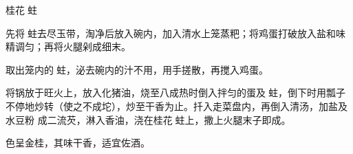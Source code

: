 \begin{recipe}{桂花𧎼蛀}

\ingredients


\preparation

\step 先将𧎼蛀去尽玉带，淘净后放入碗内，加入清水上笼蒸粑；将鸡蛋打破放入盐和味
精调匀；再将火腿剁成细末。

\step 取出笼内的𧎼蛀，泌去碗内的汁不用，用手搓散，再搅入鸡蛋。

\step 将锅放于旺火上，放入化猪油，烧至八成热时倒入拌匀的蛋及𧎼蛀，倒下时用瓢子
不停地炒转（使之不成坨），炒至干香为止。扦入走菜盘内，再倒入清汤，加盐及水豆粉
成二流芡，淋入香油，浇在桂花𧎼蛀上，撒上火腿末子即成。

\features

色呈金桂，其味干香，适宜佐酒。

\end{recipe}

